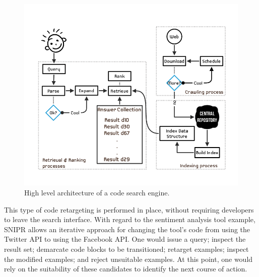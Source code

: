 \begin{figure}[!ht]
    \centering
    \includegraphics[width=\textwidth]{images/csarchitecture}
    \caption{High level architecture of a code search engine.}
    \label{fig:irarchitecture}
\end{figure}

This type of code retargeting is performed in place, without requiring developers to leave the search interface. With regard to the sentiment analysis tool example, \uppercase{SnipR} allows an iterative approach for changing the tool's code from using the Twitter API to using the Facebook API. One would issue a query; inspect the result set; demarcate code blocks to be transitioned; retarget examples; inspect the modified examples; and reject unsuitable examples. At this point, one would rely on the suitability of these candidates to identify the next course of action.

